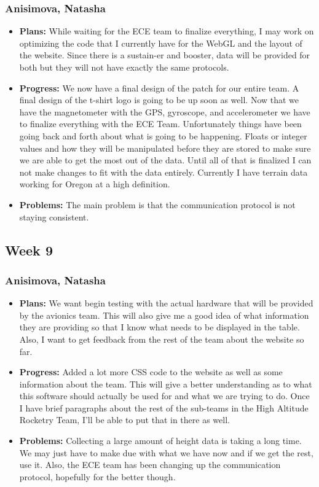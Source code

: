\documentclass[10pt,draftclsnofoot,onecolumn]{IEEEtran}
\begin{document}
\subsubsection{Anisimova, Natasha}
\begin{itemize}
	\item \textbf{Plans: }
	While waiting for the ECE team to finalize everything, I may work on optimizing the code that I currently have for the WebGL and the layout of the website. Since there is a sustain-er and booster, data will be provided for both but they will not have exactly the same protocols.
	\item \textbf{Progress: }
	We now have a final design of the patch for our entire team. A final design of the t-shirt logo is going to be up soon as well. Now that we have the magnetometer with the GPS, gyroscope, and accelerometer we have to finalize everything with the ECE Team. Unfortunately things have been going back and forth about what is going to be happening. Floats or integer values and how they will be manipulated before they are stored to make sure we are able to get the most out of the data. Until all of that is finalized I can not make changes to fit with the data entirely. Currently I have terrain data working for Oregon at a high definition.

	\item \textbf{Problems: }
	The main problem is that the communication protocol is not staying consistent.
\end{itemize}
\subsection{Week 9}
\subsubsection{Anisimova, Natasha}
\begin{itemize}
	\item \textbf{Plans: }
	We want begin testing with the actual hardware that will be provided by the avionics team. This will also give me a good idea of what information they are providing so that I know what needs to be displayed in the table. Also, I want to get feedback from the rest of the team about the website so far.
	\item \textbf{Progress: }
	Added a lot more CSS code to the website as well as some information about the team. This will give a better understanding as to what this software should actually be used for and what we are trying to do. Once I have brief paragraphs about the rest of the sub-teams in the High Altitude Rocketry Team, I'll be able to put that in there as well.

	\item \textbf{Problems: }
	Collecting a large amount of height data is taking a long time. We may just have to make due with what we have now and if we get the rest, use it. Also, the ECE team has been changing up the communication protocol, hopefully for the better though.
\end{itemize}
\end{document}
